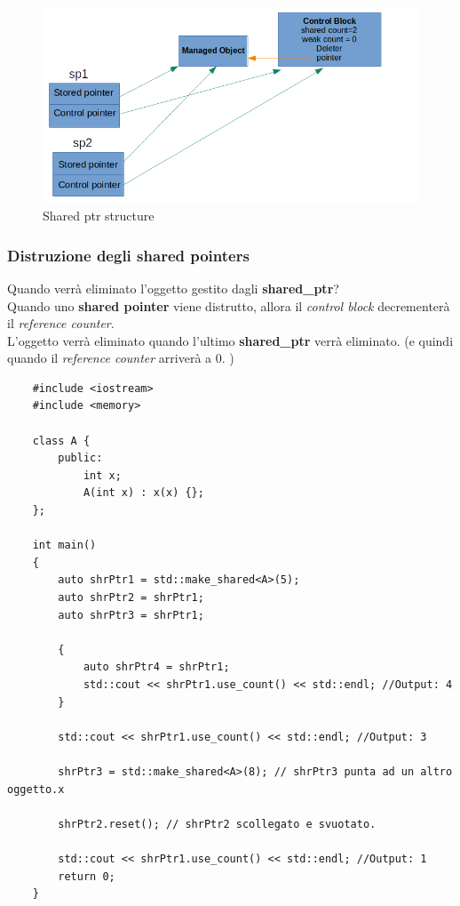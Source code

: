 \newpage %

\begin{figure}[H]
	\centering
	\includegraphics[width=1\textwidth, height=1\textheight, keepaspectratio]{./imgs/shared_ptr_structure.png}
	\caption{Shared ptr structure}
	\label{fig:shared_ptr_structure}
\end{figure}

\subsubsection{Distruzione degli shared pointers}

\textsf{\small Quando verrà eliminato l'oggetto gestito dagli \textbf{shared\_ptr}?} \\

\textsf{\small Quando uno \textbf{shared pointer} viene distrutto, allora il \emph{control block} decrementerà il \emph{reference counter}.} \\

\textsf{\small L'oggetto verrà eliminato quando l'ultimo \textbf{shared\_ptr} verrà eliminato. (e quindi quando il \emph{reference counter} arriverà a 0. )} \\

\begin{lstlisting}
	#include <iostream>
	#include <memory>
	
	class A {
		public:
			int x;
			A(int x) : x(x) {};
	};

	int main()
	{
		auto shrPtr1 = std::make_shared<A>(5);
		auto shrPtr2 = shrPtr1;
		auto shrPtr3 = shrPtr1;
		
		{
			auto shrPtr4 = shrPtr1;
			std::cout << shrPtr1.use_count() << std::endl; //Output: 4
		}
		
		std::cout << shrPtr1.use_count() << std::endl; //Output: 3
		
		shrPtr3 = std::make_shared<A>(8); // shrPtr3 punta ad un altro oggetto.x
		
		shrPtr2.reset(); // shrPtr2 scollegato e svuotato.
		
		std::cout << shrPtr1.use_count() << std::endl; //Output: 1
		return 0;
	}
\end{lstlisting}

